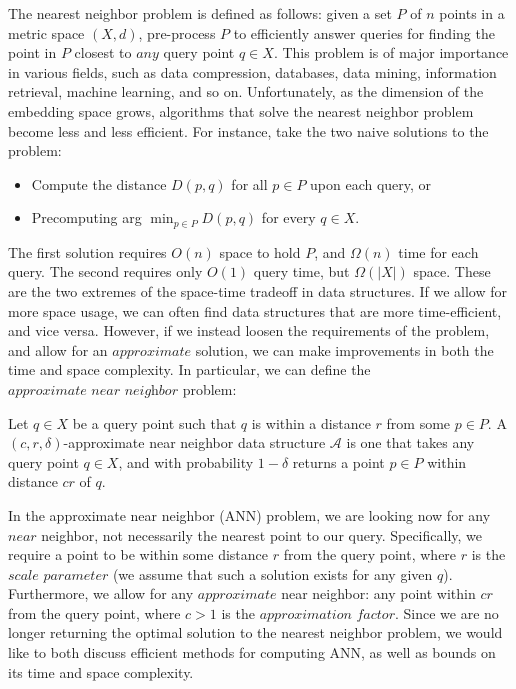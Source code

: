 
The nearest neighbor problem is defined as follows: given a set $P$ of $n$ points in a metric
space $(X, d)$, pre-process $P$ to efficiently answer queries for finding the point in $P$
closest to $\textit{any}$ query point $q \in X$. This problem is of major importance in various
fields, such as data compression, databases, data mining, information retrieval, machine learning,
and so on. Unfortunately, as the dimension of the embedding space grows, algorithms that solve the
nearest neighbor problem become less and less efficient. For instance, take the two naive solutions
to the problem:

\begin{itemize}
    \item Compute the distance $D(p, q)$ for all $p \in P$ upon each query, or
    \item Precomputing arg $\min_{p \in P} D(p, q)$ for every $q \in X$.
\end{itemize}

The first solution requires $O(n)$ space to hold $P$, and $\Omega(n)$ time for each query. The second
requires only $O(1)$ query time, but $\Omega(|X|)$ space. These are the two extremes of the space-time
tradeoff in data structures. If we allow for more space usage, we can often find data structures that
are more time-efficient, and vice versa. However, if we instead loosen the requirements of the problem,
and allow for an $\textit{approximate}$ solution, we can make improvements in both the time and space
complexity. In particular, we can define the $\textit{approximate near neighbor}$ problem:

\begin{definition}
Let $q \in X$ be a query point such that $q$ is within a distance $r$ from some $p \in P$. A
$(c, r, \delta)$-approximate near neighbor data structure $\mathcal{A}$ is one that takes any
query point $q \in X$, and with probability $1 - \delta$ returns a point $p \in P$ within distance
$cr$ of $q$.
\end{definition}

In the approximate near neighbor (ANN) problem, we are looking now for any $\textit{near}$ neighbor,
not necessarily the nearest point to our query. Specifically, we require a point to be within some
distance $r$ from the query point, where $r$ is the $\textit{scale parameter}$ (we assume that such a solution exists for any given $q$). Furthermore, we allow
for any $\textit{approximate}$ near neighbor: any point within $cr$ from the query point, where $c > 1$
is the $\textit{approximation factor}$. Since we are no longer returning the optimal solution
to the nearest neighbor problem, we would like to both discuss efficient methods for computing ANN, as well
as bounds on its time and space complexity.

